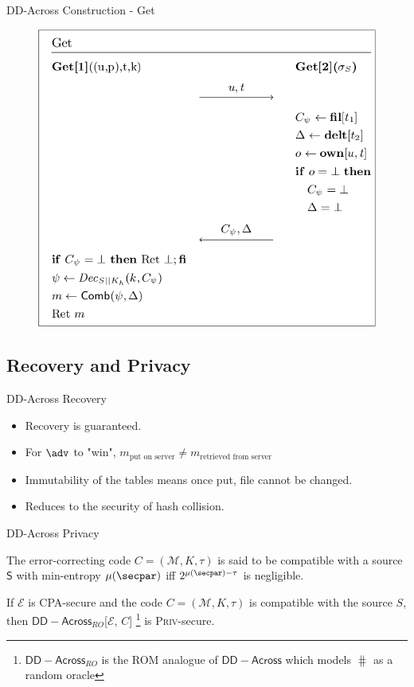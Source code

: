 \documentclass{beamer}
\newcommand{\scheme}{\mathsf{DD-Across}}
\newcommand{\msgspc}{\mathcal{M}}
\begin{document}
\begin{frame}{DD-Across Construction - Get}
		\begin{figure}[H]
    \centering
    \includegraphics[scale=0.35]{get}
	\end{figure}
\end{frame}

\subsection{Recovery and Privacy}

\begin{frame}{DD-Across Recovery}
	\begin{itemize}
		\setlength\itemsep{1em}
		\item Recovery is guaranteed.
		\item For $\adv$ to "win", $m_{\text{put on server}} \neq m_{\text{retrieved from server}}$ 
		\item Immutability of the tables means once put, file cannot be changed.
		\item Reduces to the security of hash collision.
	\end{itemize}
\end{frame}

\begin{frame}{DD-Across Privacy}

		\begin{definition}
        The error-correcting code $C=(\msgspc, K, \tau)$ is said to be compatible with a source $\mathsf{S}$ with min-entropy $\mu(\secpar)$ iff $2^{\mu(\secpar)-\tau}$ is negligible.
        \label{def}
        \end{definition}
        \begin{theorem}
    If $\mathcal{E}$ is CPA-secure and the code $C=(\msgspc, K, \tau)$ is compatible with the source $S$, then $\scheme_{RO}$[$\mathcal{E}$, $C$] \footnote{$\scheme_{RO}$ is the ROM analogue of $\scheme$ which models $\hash$ as a random oracle} is \textsc{Priv}-secure.
\end{theorem} 

\end{frame}
\end{document}
